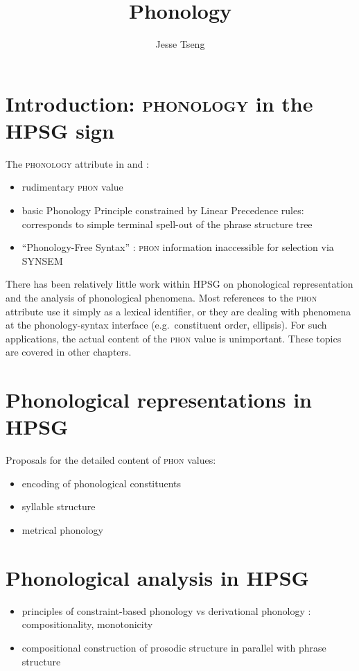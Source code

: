 \documentclass[output=paper]{langsci/langscibook}
\author{Jesse Tseng\affiliation{Université Paris Diderot}}
\title{Phonology}
\begin{document}
\label{chap-phonology}

\section{Introduction: \textsc{phonology} in the HPSG sign} 

The \textsc{phonology} attribute in \citep{ps} and \citep{ps2}: 
\begin{itemize}
\item rudimentary \textsc{phon} value 
\item basic Phonology Principle constrained by Linear Precedence
  rules: corresponds to simple terminal spell-out of the phrase structure tree
\item ``Phonology-Free Syntax'' \citep{MPZ97a-u-platte}: \textsc{phon}
  information inaccessible for selection via SYNSEM
\end{itemize}

There has been relatively little work within HPSG on phonological
representation and the analysis of phonological phenomena. Most
references to the \textsc{phon} attribute use it simply as a lexical
identifier, or they are dealing with phenomena at the phonology-syntax
interface (e.g.\ constituent order, ellipsis). For such applications,
the actual content of the \textsc{phon} value is unimportant. These
topics are covered in other chapters.

\section{Phonological representations in HPSG}

Proposals for the detailed content of \textsc{phon} values:
\begin{itemize}
\item encoding of phonological constituents \citep{BK94b,Klein2000a,Hoehle99a-u}

\item syllable structure \cite{TsengHPSG08}

\item metrical phonology \citep{Klein2000a,BonamiDelais06}
\end{itemize}

\section{Phonological analysis in HPSG}

\begin{itemize}
\item principles of constraint-based phonology vs derivational phonology
\citep{BK94b}: compositionality, monotonicity

\item compositional construction of prosodic structure in parallel
  with phrase structure \citep{Klein2000a}
\end{itemize}
\end{document}
